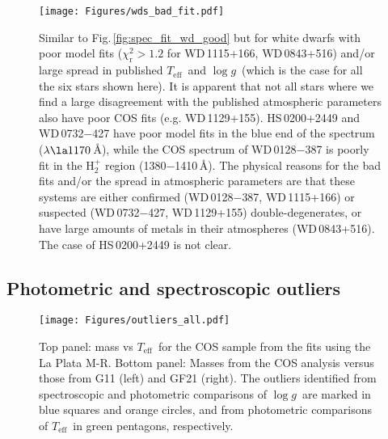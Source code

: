 \documentclass[fleqn,usenatbib, useAMS]{mnras}
\newcommand{\Teff}{\mbox{$T_{\mathrm{eff}}$}}
\newcommand{\logg}{\mbox{$\log g$}}
\begin{document}
\begin{figure*}
\centering
\texttt{[image: Figures/wds\_bad\_fit.pdf]}
\caption{Similar to Fig.\,\ref{fig:spec_fit_wd_good} but for white dwarfs with poor model fits ($\chi^{2}_\mathrm{r}>1.2$ for WD\,1115+166, WD\,0843+516) and/or large spread in published \Teff\ and \logg\ (which is the case for all the six stars shown here). It is apparent that not all stars where we find a large disagreement with the published atmospheric parameters also have poor COS fits (e.g. WD\,1129+155). HS\,0200+2449 and WD\,0732$-$427 have poor model fits in the blue end of the spectrum ($\lambda\la1170$\,\AA), while the COS spectrum of WD\,0128$-$387 is poorly fit in the H$^+_2$ region (1380$-$1410\,\AA). The physical reasons for the bad fits and/or the spread in atmospheric parameters are that these systems are either confirmed (WD\,0128$-$387, WD\,1115+166) or suspected (WD\,0732$-$427, WD\,1129+155) double-degenerates, or have large amounts of metals in their atmospheres (WD\,0843+516). The case of HS\,0200+2449 is not clear.}
\label{fig:spec_fit_wd_bad}
\end{figure*}

\subsection{Photometric and spectroscopic outliers}

\begin{figure}
\centering
\texttt{[image: Figures/outliers\_all.pdf]}
\caption{Top panel: mass vs \Teff\ for the COS sample from the fits using the La Plata M-R. Bottom panel: Masses from the COS analysis versus those from G11 (left) and GF21 (right). The outliers identified from spectroscopic and photometric comparisons of \logg\ are marked in blue squares and orange circles, and from photometric comparisons of \Teff\ in green pentagons, respectively.}
\label{fig:outl_plot}
\end{figure}
\end{document}
